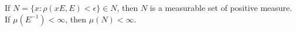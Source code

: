If $N = \{x : \rho(xE, E) < \epsilon\} \in N$, then $N$ is a measurable set of positive measure. If $\mu(E^{-1}) < \infty$, then $\mu(N) < \infty$.

